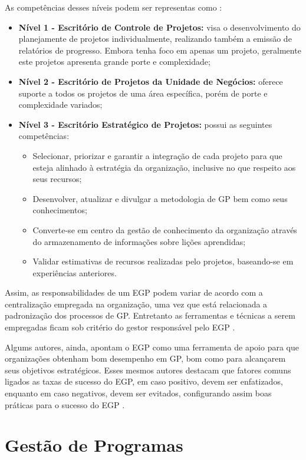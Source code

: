 As competências desses níveis podem ser representas como \cite{crawford2010strategic}:

\begin{itemize}
  \item \textbf{Nível 1 - Escritório de Controle de Projetos:} visa o desenvolvimento do planejamente de projetos individualmente, realizando também a emissão de relatórios de progresso. Embora tenha foco em apenas um projeto, geralmente este projetos apresenta grande porte e complexidade;
  \item \textbf{Nível 2 - Escritório de Projetos da Unidade de Negócios:} oferece suporte a todos os projetos de uma área específica, porém de porte e complexidade variados;
  \item \textbf{Nível 3 - Escritório Estratégico de Projetos:} possui as seguintes competências:
  \begin{itemize}
    \item Selecionar, priorizar e garantir a integração de cada projeto para que esteja alinhado à estratégia da organização, inclusive no que respeito aos seus recursos;
    \item Desenvolver, atualizar e divulgar a metodologia de GP bem como seus conhecimentos;
    \item Converte-se em centro da gestão de conhecimento da organização através do armazenamento de informações sobre lições aprendidas;
    \item Validar estimativas de recursos realizadas pelo projetos, baseando-se em experiências anteriores.
  \end{itemize}
\end{itemize}

Assim, as responsabilidades de um EGP podem variar de acordo com a centralização empregada na organização, uma vez que está relacionada a padronização dos processos de GP. Entretanto as ferramentas e técnicas a serem empregadas ficam sob critério do gestor responsável pelo EGP \cite{pmiguide2014}.

Algums autores, ainda, apontam o EGP como uma ferramenta de apoio para que organizações obtenham bom desempenho em GP, bom como para alcançarem seus objetivos estratégicos. Esses mesmos autores destacam que fatores comuns ligados as taxas de sucesso do EGP, em caso positivo, devem ser enfatizados, enquanto em caso negativos, devem ser evitados, configurando assim boas práticas para o sucesso do EGP \cite{andersen2007benchmarking}.


\section{Gestão de Programas}

